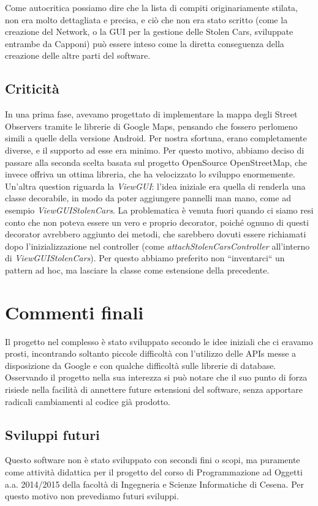\documentclass[a4paper,12pt]{report}
\begin{document}
Come autocritica possiamo dire che la lista di compiti originariamente stilata, 
non era molto dettagliata e precisa, e ciò che non era stato scritto (come la 
creazione del Network, o la GUI per la gestione delle Stolen Cars, sviluppate 
entrambe da Capponi) può essere inteso come la diretta conseguenza della 
creazione delle altre parti del software.

  \section{Criticità}
    In una prima fase, avevamo progettato di implementare la mappa degli Street 
Observers tramite le librerie di Google Maps, pensando che fossero 
perlomeno simili a quelle della versione Android. Per nostra sfortuna, 
erano completamente diverse, e il supporto ad esse era minimo. Per questo 
motivo, abbiamo deciso di passare alla seconda scelta basata sul progetto 
OpenSource OpenStreetMap, che invece offriva un ottima libreria, che ha 
velocizzato lo sviluppo enormemente.\newline
    Un'altra question riguarda la \textit{ViewGUI}: l'idea iniziale era quella 
di renderla una classe decorabile, in modo da poter aggiungere pannelli man 
mano, come ad esempio \textit{ViewGUIStolenCars}. La problematica è venuta fuori 
quando ci siamo resi conto che non poteva essere un vero e proprio decorator, 
poiché ognuno di questi decorator avrebbero aggiunto dei metodi, che sarebbero 
dovuti essere richiamati dopo l'inizializzazione nel controller (come 
\textit{attachStolenCarsController} all'interno di \textit{ViewGUIStolenCars}). 
Per questo abbiamo preferito non ``inventarci`` un pattern ad hoc, ma lasciare 
la classe come estensione della precedente.
    
   
\chapter{Commenti finali}
  Il progetto nel complesso è stato sviluppato secondo le idee iniziali che ci 
eravamo prosti, incontrando soltanto piccole difficoltà con l'utilizzo delle 
APIs messe a disposizione da Google e con qualche difficoltà sulle librerie di 
database. Osservando il progetto nella sua interezza si può notare che il suo 
punto di forza risiede nella facilità di annettere future estensioni del 
software, senza apportare radicali cambiamenti al codice già prodotto.

  \section{Sviluppi futuri}
  Questo software non è stato sviluppato con secondi fini o scopi, ma puramente 
come attività didattica per il progetto del corso di Programmazione ad Oggetti 
a.a. 2014/2015 della facoltà di Ingegneria e Scienze Informatiche di Cesena. 
Per questo motivo non prevediamo futuri sviluppi.
\end{document}
